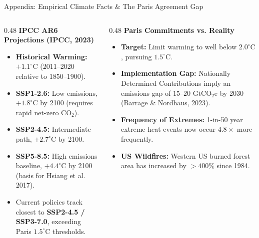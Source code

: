 \documentclass[aspectratio=169, 10pt]{beamer}
\begin{document}
\begin{frame}{Appendix: Empirical Climate Facts \& The Paris Agreement Gap \hfill \hyperlink{main:fact1}{\scriptsize{}}}\label{backup:climate_facts}
    \begin{columns}[T]
        \begin{column}{0.48\textwidth}
            \textbf{\small IPCC AR6 Projections (IPCC, 2023)}
            \vspace{0.05cm}
            \begin{itemize}\scriptsize\setlength{\itemsep}{2pt}
                \item \textbf{Historical Warming:} $+1.1^\circ\text{C}$ (2011--2020 relative to 1850--1900).
                \item \textbf{SSP1-2.6:} Low emissions, $+1.8^\circ\text{C}$ by 2100 (requires rapid net-zero CO$_2$).
                \item \textbf{SSP2-4.5:} Intermediate path, $+2.7^\circ\text{C}$ by 2100.
                \item \textbf{SSP5-8.5:} High emissions baseline, $+4.4^\circ\text{C}$ by 2100 (basis for Hsiang et al. 2017).
                \item Current policies track closest to \textbf{SSP2-4.5 / SSP3-7.0}, exceeding Paris $1.5^\circ\text{C}$ thresholds.
            \end{itemize}
        \end{column}
        
        \begin{column}{0.48\textwidth}
            \textbf{\small Paris Commitments vs. Reality}
            \vspace{0.05cm}
            \begin{itemize}\scriptsize\setlength{\itemsep}{2pt}
                \item \textbf{Target:} Limit warming to well below $2.0^\circ\text{C}$, pursuing $1.5^\circ\text{C}$.
                \item \textbf{Implementation Gap:} Nationally Determined Contributions imply an emissions gap of $15\text{--}20\text{ GtCO}_2\text{e}$ by 2030 (Barrage \& Nordhaus, 2023).
                \item \textbf{Frequency of Extremes:} 1-in-50 year extreme heat events now occur $4.8\times$ more frequently.
                \item \textbf{US Wildfires:} Western US burned forest area has increased by $>400\%$ since 1984.
            \end{itemize}
        \end{column}
    \end{columns}
\end{frame}
\end{document}

